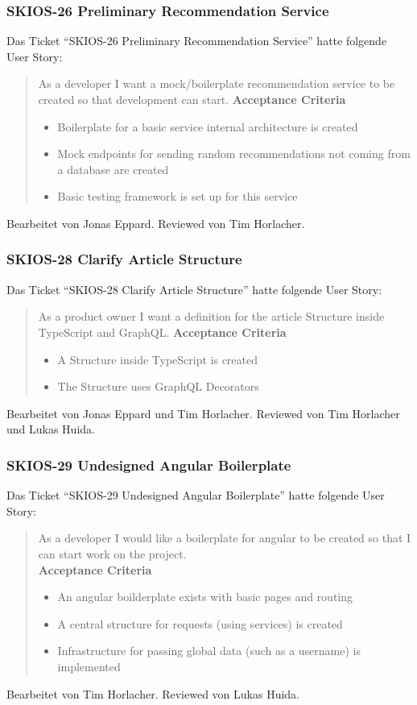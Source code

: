 \subsubsection{SKIOS-26 Preliminary Recommendation Service}
Das Ticket \enquote{SKIOS-26 Preliminary Recommendation Service} hatte folgende User Story:
\begin{quotation}
    As a developer I want a mock/boilerplate recommendation service to be created so that development can start.
    \textbf{Acceptance Criteria}
    \begin{itemize}
        \item Boilerplate for a basic service internal architecture is created
        \item Mock endpoints for sending random recommendations not coming from a database are created
        \item Basic testing framework is set up for this service
    \end{itemize}
\end{quotation}
Bearbeitet von Jonas Eppard.
Reviewed von Tim Horlacher.

\subsubsection{SKIOS-28 Clarify Article Structure}
Das Ticket \enquote{SKIOS-28 Clarify Article Structure} hatte folgende User Story:
\begin{quotation}
    As a product owner I want a definition for the article Structure inside TypeScript and GraphQL.
\textbf{Acceptance Criteria}
\begin{itemize}
    \item A Structure inside TypeScript is created
    \item The Structure uses GraphQL Decorators
\end{itemize}
\end{quotation}
Bearbeitet von Jonas Eppard und Tim Horlacher.
Reviewed von Tim Horlacher und Lukas Huida.

\subsubsection{SKIOS-29 Undesigned Angular Boilerplate}
Das Ticket \enquote{SKIOS-29 Undesigned Angular Boilerplate} hatte folgende User Story:
\begin{quotation}
    As a developer I would like a boilerplate for angular to be created so that I can start work on the project. \\
    \textbf{Acceptance Criteria}
    \begin{itemize}
        \item An angular boilderplate exists with basic pages and routing
        \item A central structure for requests (using services) is created
        \item Infrastructure for passing global data (such as a username) is implemented
    \end{itemize}
\end{quotation}
Bearbeitet von Tim Horlacher.
Reviewed von Lukas Huida.

